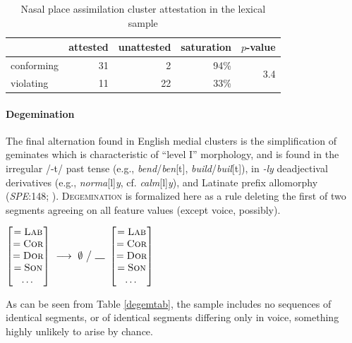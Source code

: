 \begin{table}
\centering
\begin{tabular}{l rrrr}
\toprule
           & attested & unattested & saturation & $p$-value \\
\midrule
conforming & 31       & 2          & 94\%       & \multirow{2}{*}{3.4\e{-07}} \\
violating  & 11       & 22         & 33\%       \\
\bottomrule
\end{tabular}
\caption{Nasal place assimilation cluster attestation in the lexical sample}
\label{npatab}
\end{table}

\paragraph{Degemination} 
The final alternation found in English medial clusters is the simplification of geminates which is characteristic of ``level I'' morphology, and is found in the irregular /-t/ past tense (e.g., \emph{bend}/\emph{ben}[t], \emph{build}/\emph{buil}[t]), in \emph{-ly} deadjectival derivatives (e.g., \emph{norma}[l]\emph{y}, cf. \emph{calm}[l]\emph{y}), and Latinate prefix allomorphy (\emph{SPE}:148; \citealt[102]{Borowsky1986}). \textsc{Degemination} is formalized here as a rule deleting the first of two segments agreeing on all feature values (except voice, possibly).
\label{degemx}

\begin{example}
$\begin{bmatrix} =\textsc{Lab} \\ =\textsc{Cor} \\ =\textsc{Dor} \\ =\textsc{Son} \\ \ldots{} \end{bmatrix}~\goesto~\emptyset~\big /~\gap~\begin{bmatrix} =\textsc{Lab} \\ =\textsc{Cor} \\ =\textsc{Dor} \\ =\textsc{Son} \\ \ldots{} \end{bmatrix}$
\end{example}

\noindent
As can be seen from Table \ref{degemtab}, the sample includes no sequences of identical segments, or of identical segments differing only in voice, something highly unlikely to arise by chance.

